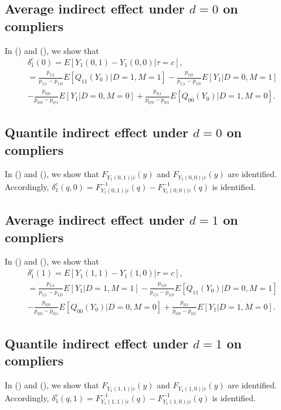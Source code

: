 \documentclass[a4paper,12pt]{article}
\begin{document}
 \doublespacing \pagestyle{plain}
\subsection{Average indirect effect
under $d = 0$ on compliers}
In () and (), we show that
\begin{align*}
\delta_{1}^{c}(0) = E[Y_1(0,1) -Y_1(0,0)|\tau=c],\\
= \frac{p_{1|1}}{p_{1|1}-p_{1|0}}E[Q_{11}(Y_0)|D=1,M=1] - \frac{p_{1|0}}{p_{1|1}-p_{1|0}}E[Y_1|D=0,M=1]\\
- \frac{p_{0|0}}{ p_{0|0} - p_{0|1}} E[Y_1|D=0,M=0] +\frac{p_{0|1}}{p_{0|0} - p_{0|1}}E[Q_{00}(Y_0)|D=1,M=0].
\end{align*}
\subsection{Quantile indirect effect
under $d = 0$ on compliers}
In () and (), we show that $F_{Y_{1}(0,1)|c}(y)$ and $F_{Y_{1}(0,0)|c}(y)$ are identified. Accordingly, $\delta_1^{c}(q,0) = F_{Y_{1}(0,1)|c}^{-1}(q)-F_{Y_{1}(0,0)|c}^{-1}(q)$ is identified.
\subsection{Average indirect effect
under $d = 1$ on compliers}
In () and (), we show that
\begin{align*}
\delta_1^{c}(1) = E[Y_1(1,1) -Y_1(1,0)|\tau= c],\\
= \frac{p_{1|1}}{ p_{1|1} - p_{1|0}} E[Y_1|D=1,M=1] -\frac{p_{1|0}}{p_{1|1} - p_{1|0}}E[Q_{11}(Y_0)|D=0,M=1]\\
- \frac{p_{0|0}}{p_{0|0} - p_{0|1}}E[Q_{00}(Y_0)|D=0,M=0] + \frac{p_{0|1}}{p_{0|0} - p_{0|1}}E[Y_1|D=1,M=0].
\end{align*}
\subsection{Quantile indirect effect
under $d = 1$ on compliers}
In () and (), we show that $F_{Y_{1}(1,1)|c}(y)$ and $F_{Y_{1}(1,0)|c}(y)$ are identified. Accordingly,  $\delta_1^{c}(q,1) = F_{Y_{1}(1,1)|c}^{-1}(q)-F_{Y_{1}(1,0)|c}^{-1}(q)$ is identified.
\end{document}
